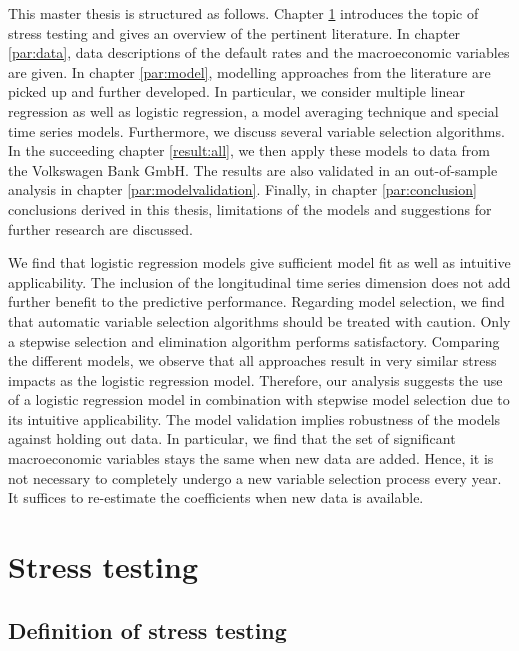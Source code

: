 \documentclass[a4paper, 11pt]{scrreprt}
\begin{document}
\pagebreak

This master thesis is structured as follows. Chapter \ref{par:stresstesting} introduces the topic of stress testing and gives an overview of the pertinent literature. In chapter \ref{par:data}, data descriptions of the default rates and the macroeconomic variables are given. In chapter \ref{par:model}, modelling approaches from the literature  are picked up and further developed. In particular, we consider multiple linear regression as well as logistic regression, a model averaging technique and special time series models. Furthermore, we discuss several variable selection algorithms.
In the succeeding chapter \ref{result:all}, we then apply these models to data from the Volkswagen Bank GmbH. 
The results are also validated in an out-of-sample analysis in chapter \ref{par:modelvalidation}. Finally, in chapter \ref{par:conclusion} conclusions derived in this thesis, limitations of the models and suggestions for further research are discussed. 

\bigskip

We find that logistic regression models give sufficient model fit as well as intuitive applicability. The inclusion of the longitudinal time series dimension does not add further benefit to the predictive performance. Regarding model selection, we find that automatic variable selection algorithms should be treated with caution. Only a stepwise selection and elimination algorithm performs satisfactory. Comparing the different models, we observe that all approaches result in very similar stress impacts as the logistic regression model.
Therefore, our analysis suggests the use of a logistic regression model in combination with stepwise model selection due to its intuitive applicability.
The model validation implies robustness of the models against holding out data. In particular, we find that the set of significant macroeconomic variables stays the same when new data are added.
Hence, it is not necessary to completely undergo a new variable selection process every year. It suffices to re-estimate the coefficients when new data is available. 



\chapter{Stress testing}\label{par:stresstesting}

\section{Definition of stress testing}\label{par:definitionstress}
\end{document}
